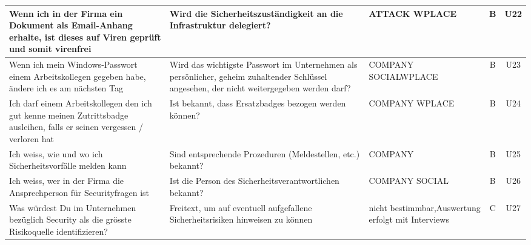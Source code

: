 \documentclass[../../main.tex]{subfiles}
\begin{document}
\begin{table}[H]
\begin{tabular}{ |p{5.5cm}|p{5.5cm}|p{2.5cm}|c|c|}
Wenn ich in der Firma ein Dokument als Email-Anhang erhalte, ist dieses auf Viren geprüft und somit virenfrei & Wird die Sicherheitszuständigkeit an die Infrastruktur delegiert? & ATTACK \newline WPLACE & B & U22 \\
\hline

Wenn ich mein Windows-Passwort einem Arbeitskollegen gegeben habe, ändere ich es am nächsten Tag & Wird das wichtigste Passwort im Unternehmen als persönlicher, geheim zuhaltender Schlüssel angesehen, der nicht weitergegeben werden darf? & COMPANY \newline SOCIAL\newline WPLACE & B & U23 \\
\hline

Ich darf einem Arbeitskollegen den ich gut kenne meinen Zutrittsbadge ausleihen, falls er seinen vergessen / verloren hat & Ist bekannt, dass Ersatzbadges bezogen werden können? & COMPANY \newline WPLACE & B & U24 \\
\hline

Ich weiss, wie und wo ich Sicherheitsvorfälle melden kann & Sind entsprechende Prozeduren (Meldestellen, etc.) bekannt? & COMPANY & B & U25 \\
\hline

Ich weiss, wer in der Firma die Ansprechperson für Securityfragen ist & Ist die Person des Sicherheitsverantwortlichen bekannt? & COMPANY \newline SOCIAL & B & U26 \\
\hline

Was würdest Du im Unternehmen bezüglich Security als die grösste Risikoquelle identifizieren? & Freitext, um auf eventuell aufgefallene Sicherheitsrisiken hinweisen zu können & nicht bestimmbar,\newline Auswertung erfolgt mit Interviews & C & U27 \\
\hline

\end{tabular}
\end{table}
\end{document}
